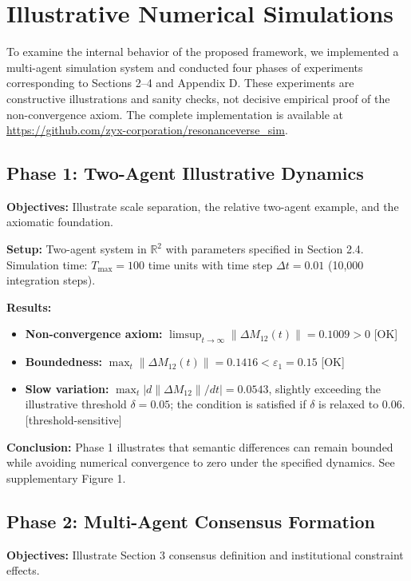 \documentclass[11pt,a4paper]{article}
\theoremstyle{definition}
\begin{document}
\section{Illustrative Numerical Simulations}

To examine the internal behavior of the proposed framework, we implemented a multi-agent simulation system and conducted four phases of experiments corresponding to Sections 2--4 and Appendix D. These experiments are constructive illustrations and sanity checks, not decisive empirical proof of the non-convergence axiom. The complete implementation is available at \url{https://github.com/zyx-corporation/resonanceverse_sim}.

\subsection{Phase 1: Two-Agent Illustrative Dynamics}

\textbf{Objectives:} Illustrate scale separation, the relative two-agent example, and the axiomatic foundation.

\textbf{Setup:} Two-agent system in $\mathbb{R}^2$ with parameters specified in Section 2.4. Simulation time: $T_{\max}=100$ time units with time step $\Delta t=0.01$ (10,000 integration steps).

\textbf{Results:}
\begin{itemize}
\item \textbf{Non-convergence axiom:} $\limsup_{t \to \infty} \|\Delta M_{12}(t)\| = 0.1009 > 0$ [OK]
\item \textbf{Boundedness:} $\max_t \|\Delta M_{12}(t)\| = 0.1416 < \varepsilon_1 = 0.15$ [OK]
\item \textbf{Slow variation:} $\max_t |d\|\Delta M_{12}\|/dt| = 0.0543$, slightly exceeding the illustrative threshold $\delta = 0.05$; the condition is satisfied if $\delta$ is relaxed to $0.06$. [threshold-sensitive]
\end{itemize}

\textbf{Conclusion:} Phase 1 illustrates that semantic differences can remain bounded while avoiding numerical convergence to zero under the specified dynamics. See supplementary Figure 1.

\subsection{Phase 2: Multi-Agent Consensus Formation}

\textbf{Objectives:} Illustrate Section 3 consensus definition and institutional constraint effects.
\end{document}
